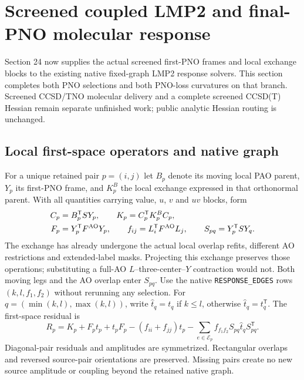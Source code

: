 \documentclass[11pt]{article}
\begin{document}
\section{Screened coupled LMP2 and final-PNO molecular response}
Section 24 now supplies the actual screened first-PNO frames and local exchange
blocks to the existing native fixed-graph LMP2 response solvers. This section
completes both PNO selections and both PNO-loss curvatures on that branch.
Screened CCSD/TNO molecular delivery and a complete screened CCSD(T) Hessian
remain separate unfinished work; public analytic Hessian routing is unchanged.

\subsection{Local first-space operators and native graph}
For a unique retained pair $p=(i,j)$ let $B_p$ denote its moving local PAO
parent, $Y_p$ its first-PNO frame, and $K_p^{B}$ the local exchange expressed
in that orthonormal parent. With all quantities carrying value, $u$, $v$ and
$uv$ blocks, form
\begin{align}
 C_p&=B_p^{\mathsf T}S Y_p,\qquad
 K_p=C_p^{\mathsf T}K_p^{B}C_p,\\
 F_p&=Y_p^{\mathsf T}F^{\rm AO}Y_p,\qquad
 f_{ij}=L_i^{\mathsf T}F^{\rm AO}L_j,\qquad
 S_{pq}=Y_p^{\mathsf T}SY_q .
\end{align}
The exchange has already undergone the actual local overlap refits,
different AO restrictions and extended-label masks. Projecting this exchange
preserves those operations; substituting a full-AO $L$--three-center--$Y$
contraction would not. Both moving legs and the AO overlap enter $S_{pq}$.
Use the native \texttt{RESPONSE\_EDGES} rows $(k,l,f_1,f_2)$ without rerunning
any selection. For $q=(\min(k,l),\max(k,l))$, write
$\widehat t_q=t_q$ if $k\leq l$, otherwise $\widehat t_q=t_q^{\mathsf T}$.
The first-space residual is
\begin{equation}
 R_p=K_p+F_pt_p+t_pF_p-(f_{ii}+f_{jj})t_p
       -\sum_{e\in\mathcal E_p}f_{f_1f_2}S_{pq}\widehat t_qS_{pq}^{\mathsf T}.
 \label{eq:screened-lmp2-residual}
\end{equation}
Diagonal-pair residuals and amplitudes are symmetrized. Rectangular overlaps
and reversed source-pair orientations are preserved. Missing pairs create no
new source amplitude or coupling beyond the retained native graph.
\end{document}
